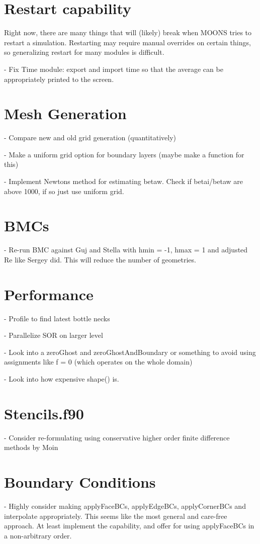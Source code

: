 \documentclass[11pt]{article}
\begin{document}
\section{Restart capability}
Right now, there are many things that will (likely) break when MOONS tries to restart a simulation. Restarting may require manual overrides on certain things, so generalizing restart for many modules is difficult.

- Fix Time module: export and import time so that the average can be appropriately
printed to the screen.



\section{Mesh Generation}

- Compare new and old grid generation (quantitatively)

- Make a uniform grid option for boundary layers (maybe make a function for this)

- Implement Newtons method for estimating betaw. Check if betai/betaw
are above 1000, if so just use uniform grid.


\section{BMCs}

- Re-run BMC against Guj and Stella with hmin = -1, hmax = 1 and adjusted Re like Sergey
  did. This will reduce the number of geometries.

\section{Performance}
- Profile to find latest bottle necks

- Parallelize SOR on larger level

- Look into a zeroGhost and zeroGhostAndBoundary or something to avoid using assignments like f = 0 (which operates on the whole domain)

- Look into how expensive shape() is.


\section{Stencils.f90}
- Consider re-formulating using conservative higher order finite difference methods by Moin

\section{Boundary Conditions}
- Highly consider making applyFaceBCs, applyEdgeBCs, applyCornerBCs and interpolate appropriately. This seems like the most general and care-free approach. At least implement the capability, and offer for using applyFaceBCs in a non-arbitrary order.
\end{document}
